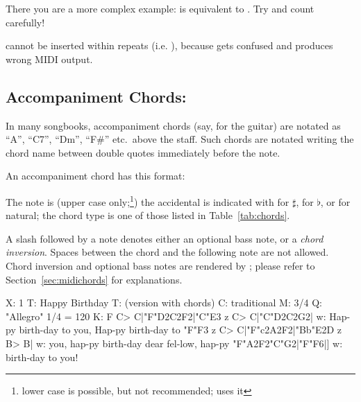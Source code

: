 \documentclass[a4paper,fullpage,12pt]{book}
\begin{document}
There you are a more complex example:  is
equivalent to . Try and
count carefully!

\begin{vimp}

   cannot be inserted within repeats (i.e.
  \cmd{|:}{\ldots}\cmd{:|}), because \abcmid{} gets confused and
  produces wrong MIDI output.

\end{vimp}


\subsection{Accompaniment Chords: }
\label{sec:acchords}

In many songbooks, accompaniment chords (say, for the guitar) are
notated as ``A'', ``C7'', ``Dm'', ``F\#'' etc.\ above the staff. Such
chords are notated writing the chord name between double quotes
 immediately before the note.

An accompaniment chord has this format:

\medskip

   

\medskip

The note is  (upper case only;\footnote{lower
case is possible, but not recommended; \abcMID{} uses it}) the
accidental is indicated with \car{\#} for $\sharp$,  for
$\flat$, or \car{=} for natural; the chord type is one of those listed
in Table~\ref{tab:chords}.

A slash \car{/} followed by a note  denotes
either an optional bass note, or a \emph{chord inversion}. Spaces
between the chord and the following note are not allowed. Chord
inversion and optional bass notes are rendered by \abcmid{}; please
refer to Section~\ref{sec:midichords} for explanations. 

\begin{abcsource}
X: 1
T: Happy Birthday
T: (version with chords)
C: traditional
M: 3/4
Q: "Allegro" 1/4 = 120 %
K: F
C> C|"F"D2C2F2|"C"E3 z C> C|"C"D2C2G2|
w: Hap-py birth-day to you, Hap-py birth-day to
"F"F3 z C> C|"F"c2A2F2|"Bb"E2D z B> B|
w: you, hap-py birth-day dear fel-low, hap-py
"F"A2F2"C"G2|"F"F6|]
w: birth-day to you!
\end{abcsource}
\end{document}
